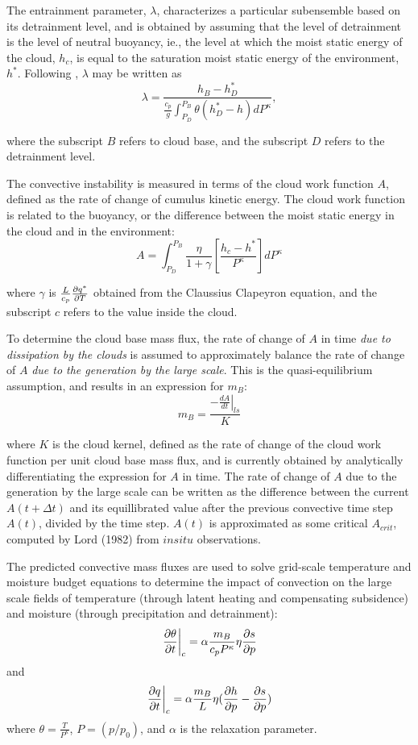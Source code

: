 The entrainment parameter, $\lambda$, characterizes a particular subensemble based on its
detrainment level, and is obtained by assuming that the level of detrainment is the level of neutral
buoyancy, ie., the level at which the moist static energy of the cloud, $h_c$, is equal 
to the saturation moist static energy of the environment, $h^*$.  Following \cite{moorsz:92},
$\lambda$ may be written as
\[
\lambda = \frac{h_B - h^*_D}{ \frac{c_p}{g} \int_{P_D}^{P_B}\theta(h^*_D-h)dP^{\kappa}},
\]

where the subscript $B$ refers to cloud base, and the subscript $D$ refers to the detrainment level.


The convective instability is measured in terms of the cloud work function $A$, defined as the
rate of change of cumulus kinetic energy. The cloud work function is 
related to the buoyancy, or the difference
between the moist static energy in the cloud and in the environment:
\[
A = \int_{P_D}^{P_B} \frac{\eta}{1 + \gamma}
\left[ \frac{h_c-h^*}{P^{\kappa}} \right] dP^{\kappa}
\]

where $\gamma$ is $\frac{L}{c_p}\frac{\partial q^*}{\partial T}$ obtained from the Claussius Clapeyron equation,
and the subscript $c$ refers to the value inside the cloud.


To determine the cloud base mass flux, the rate of change of $A$ in time {\em due to dissipation by 
the clouds} is assumed to approximately balance the rate of change of $A$ {\em due to the generation 
by the large scale}. This is the quasi-equilibrium assumption, and results in an expression for $m_B$:
\[
m_B = \frac{- \left. \frac{dA}{dt} \right|_{ls}}{K}
\]

where $K$ is the cloud kernel, defined as the rate of change of the cloud work function per
unit cloud base mass flux, and is currently obtained by analytically differentiating the 
expression for $A$ in time.
The rate of change of $A$ due to the generation by the large scale can be written as the
difference between the current $A(t+\Delta t)$ and its equillibrated value after the previous 
convective time step 
$A(t)$, divided by the time step. $A(t)$ is approximated as some critical $A_{crit}$,
computed by Lord (1982) from $in situ$ observations.


The predicted convective mass fluxes are used to solve grid-scale temperature
and moisture budget equations to determine the impact of convection on the large scale fields of
temperature (through latent heating and compensating subsidence) and moisture (through
precipitation and detrainment):
\[
\left.{\frac{\partial \theta}{\partial t}}\right|_{c} = \alpha \frac{ m_B}{c_p P^{\kappa}} \eta \frac{\partial s}{\partial p}
\]
and
\[
\left.{\frac{\partial q}{\partial t}}\right|_{c} = \alpha \frac{ m_B}{L} \eta (\frac{\partial h}{\partial p}-\frac{\partial s}{\partial p})
\]
where $\theta = \frac{T}{P^{\kappa}}$, $P = (p/p_0)$, and $\alpha$ is the relaxation parameter.

